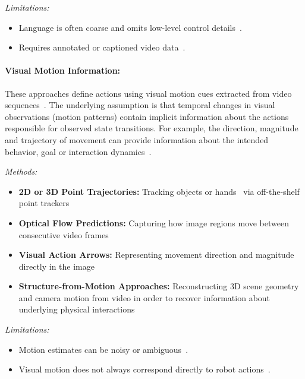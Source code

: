 \textit{Limitations:}
\begin{itemize}
    \item Language is often coarse and omits low-level control details~\cite{McCarthy_2025}.
    \item Requires annotated or captioned video data~\cite{McCarthy_2025}.
\end{itemize}






\paragraph{Visual Motion Information:}

These approaches define actions using visual motion cues extracted from video sequences~\cite{McCarthy_2025}. The underlying assumption is that temporal changes in visual observations (motion patterns) contain implicit information about the actions responsible for observed state transitions. For example, the direction, magnitude and trajectory of movement can provide information about the intended behavior, goal or interaction dynamics~\cite{yanokura2020understanding, Tokmakov17}.

\textit{Methods:}
\begin{itemize}
    \item \textbf{2D or 3D Point Trajectories:} Tracking objects or hands~\cite{Wen2023AnypointTM, Yuan2024GeneralFA} via off-the-shelf point trackers~\cite{karaev2024cotracker}
    \item \textbf{Optical Flow Predictions:} Capturing  how image regions move between consecutive video frames~\cite{Ko2023LearningTA, xu2022gmflow}
    \item \textbf{Visual Action Arrows:} Representing movement direction and magnitude directly in the image~\cite{Nasiriany2024PIVOTIV}
    \item \textbf{Structure-from-Motion Approaches:} Reconstructing 3D scene geometry and camera motion from video in order to recover information about underlying physical interactions~\cite{Wang2023ManipulateBS, Yuan2021DMotionRV, Yang2023LearningIR}
\end{itemize}

\textit{Limitations:}
\begin{itemize}
    \item Motion estimates can be noisy or ambiguous~\cite{booij2010efficient}.
    \item Visual motion does not always correspond directly to robot actions~\cite{booij2010efficient}.
\end{itemize}




